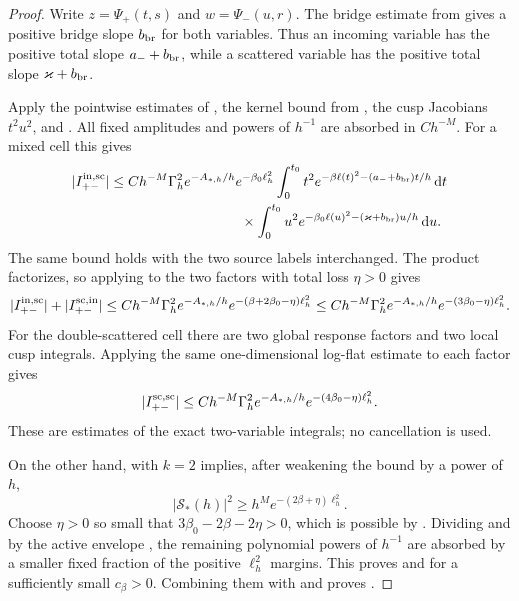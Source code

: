 \documentclass[11pt]{article}
\newcommand{\dd}{\,\mathrm d}
\begin{document}
\begin{proof}
Write $z=\Psi_+(t,s)$ and $w=\Psi_-(u,r)$.  The bridge estimate
 from 
gives a positive bridge slope $b_{\rm br}$ for both variables.  Thus an
incoming variable has the positive total slope $a_-+b_{\rm br}$, while a
scattered variable has the positive total slope $\varkappa+b_{\rm br}$.

Apply the pointwise estimates of , the kernel
bound from , the cusp Jacobians $t^2u^2$,
and .  All fixed amplitudes and powers of
$h^{-1}$ are absorbed in $Ch^{-M}$.  For a mixed cell this gives
\begin{align}
 |I_{+-}^{\rm in,sc}|
 &\le Ch^{-M}\Gamma_h^2e^{-A_{*,h}/h}e^{-\beta_0\ell_h^2}
 \int_0^{t_0}t^2e^{-\beta\ell(t)^2-(a_-+b_{\rm br})t/h}\dd t\notag\\
 &\hspace{3.3cm}\times
 \int_0^{t_0}u^2e^{-\beta_0\ell(u)^2-(\varkappa+b_{\rm br})u/h}\dd u.
 \label{eq:mixed-response-product}
\end{align}
The same bound holds with the two source labels interchanged.  The product
factorizes, so applying  to the two factors with
total loss $\eta>0$ gives
\begin{equation}\label{eq:mixed-response-absolute}
 |I_{+-}^{\rm in,sc}|+|I_{+-}^{\rm sc,in}|
 \le Ch^{-M}\Gamma_h^2e^{-A_{*,h}/h}
 e^{-(\beta+2\beta_0-\eta)\ell_h^2}
 \le Ch^{-M}\Gamma_h^2e^{-A_{*,h}/h}
 e^{-(3\beta_0-\eta)\ell_h^2}.
\end{equation}
For the double-scattered cell there are two global response factors and two
local cusp integrals.  Applying the same one-dimensional log-flat estimate
to each factor gives
\begin{equation}\label{eq:double-response-absolute}
 |I_{+-}^{\rm sc,sc}|
 \le Ch^{-M}\Gamma_h^2e^{-A_{*,h}/h}
 e^{-(4\beta_0-\eta)\ell_h^2}.
\end{equation}
These are estimates of the exact two-variable integrals; no cancellation is
used.

On the other hand,  with $k=2$ implies, after
weakening the bound by a power of $h$,
\begin{equation}\label{eq:Qstar-lower-response}
 |\mathcal S_*(h)|^2\ge h^M e^{-(2\beta+\eta)\ell_h^2}.
\end{equation}
Choose $\eta>0$ so small that
$3\beta_0-2\beta-2\eta>0$, which is possible by
.  Dividing
 and
 by the active envelope
, the remaining polynomial powers of $h^{-1}$ are
absorbed by a smaller fixed fraction of the positive $\ell_h^2$ margins.
This proves  and
 for a sufficiently small $c_\beta>0$.
Combining them with  and
 proves .


\end{proof}
\end{document}
